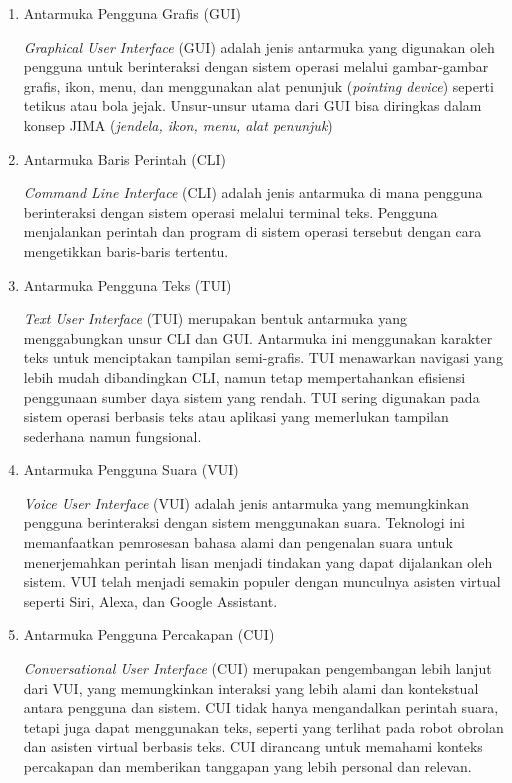 \documentclass[12pt]{article}
\begin{document}
\begin{enumerate}
    \item{Antarmuka Pengguna Grafis (GUI)}

\textit{Graphical User Interface} (GUI) adalah jenis antarmuka yang digunakan oleh pengguna untuk berinteraksi dengan sistem operasi melalui gambar-gambar grafis, ikon, menu, dan menggunakan alat penunjuk (\textit{pointing device}) seperti tetikus atau bola jejak. Unsur-unsur utama dari GUI bisa diringkas dalam konsep JIMA (\textit{jendela, ikon, menu, alat penunjuk})

 \item{Antarmuka Baris Perintah (CLI)}

\textit{Command Line Interface} (CLI) adalah jenis antarmuka di mana pengguna berinteraksi dengan sistem operasi melalui terminal teks. Pengguna menjalankan perintah dan program di sistem operasi tersebut dengan cara mengetikkan baris-baris tertentu.

\item{Antarmuka Pengguna Teks (TUI)}

\textit{Text User Interface} (TUI) merupakan bentuk antarmuka yang menggabungkan unsur CLI dan GUI. Antarmuka ini menggunakan karakter teks untuk menciptakan tampilan semi-grafis. TUI menawarkan navigasi yang lebih mudah dibandingkan CLI, namun tetap mempertahankan efisiensi penggunaan sumber daya sistem yang rendah. TUI sering digunakan pada sistem operasi berbasis teks atau aplikasi yang memerlukan tampilan sederhana namun fungsional.

\item {Antarmuka Pengguna Suara (VUI)}

\textit{Voice User Interface} (VUI) adalah jenis antarmuka yang memungkinkan pengguna berinteraksi dengan sistem menggunakan suara. Teknologi ini memanfaatkan pemrosesan bahasa alami dan pengenalan suara untuk menerjemahkan perintah lisan menjadi tindakan yang dapat dijalankan oleh sistem. VUI telah menjadi semakin populer dengan munculnya asisten virtual seperti Siri, Alexa, dan Google Assistant.

\item{Antarmuka Pengguna Percakapan (CUI)}

\textit{Conversational User Interface} (CUI) merupakan pengembangan lebih lanjut dari VUI, yang memungkinkan interaksi yang lebih alami dan kontekstual antara pengguna dan sistem. CUI tidak hanya mengandalkan perintah suara, tetapi juga dapat menggunakan teks, seperti yang terlihat pada robot obrolan dan asisten virtual berbasis teks. CUI dirancang untuk memahami konteks percakapan dan memberikan tanggapan yang lebih personal dan relevan.

\end{enumerate}
\end{document}

